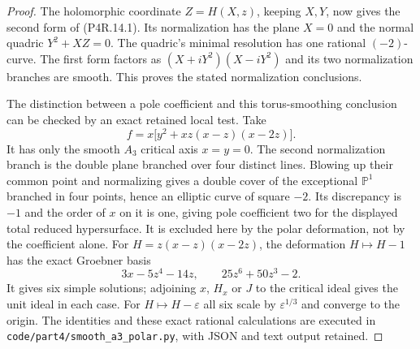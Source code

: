 \begin{proof}
The holomorphic coordinate $Z=H(X,z)$, keeping $X,Y$, now
gives the second form of (P4R.14.1). Its normalization has
the plane $X=0$ and the normal quadric $Y^2+XZ=0$. The
quadric's minimal resolution has one rational $(-2)$-curve.
The first form factors as $(X+iY^2)(X-iY^2)$ and its two
normalization branches are smooth. This proves the stated
normalization conclusions.

The distinction between a pole coefficient and this
torus-smoothing conclusion can be checked by an exact
retained local test. Take
\[
 f=x\bigl[y^2+xz(x-z)(x-2z)\bigr].
\]
It has only the smooth $A_3$ critical axis $x=y=0$. The
second normalization branch is the double plane branched
over four distinct lines. Blowing up their common point
and normalizing gives a double cover of the exceptional
$\mathbb P^1$ branched in four points, hence an elliptic
curve of square $-2$. Its discrepancy is $-1$ and the
order of $x$ on it is one, giving pole coefficient two
for the displayed total reduced hypersurface. It is excluded
here by the polar deformation, not by the coefficient alone.
For $H=z(x-z)(x-2z)$, the deformation $H\mapsto H-1$ has
the exact Groebner basis
\[
 3x-5z^4-14z,\qquad 25z^6+50z^3-2.
\]
It gives six simple solutions; adjoining $x$, $H_x$ or
$J$ to the critical ideal gives the unit ideal in each
case. For $H\mapsto H-\varepsilon$ all six scale by
$\varepsilon^{1/3}$ and converge to the origin. The
identities and these exact rational calculations are
executed in \texttt{code/part4/smooth\_a3\_polar.py},
with JSON and text output retained.
\end{proof}
